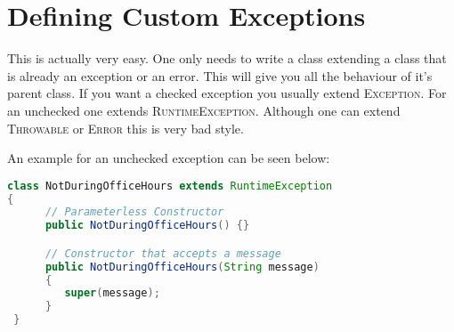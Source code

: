 \documentclass{scrartcl}
\begin{document}
\section{Defining Custom Exceptions}
This is actually very easy. One only needs to write a class extending a class that is already an exception or an error. This will give you all the behaviour of it's parent class. If you want a checked exception you usually extend \textsc{Exception}. For an unchecked one extends \textsc{RuntimeException}. Although one can extend \textsc{Throwable} or \textsc{Error} this is very bad style.

An example for an unchecked exception can be seen below:
\begin{lstlisting}[language=java]
class NotDuringOfficeHours extends RuntimeException
{
      // Parameterless Constructor
      public NotDuringOfficeHours() {}

      // Constructor that accepts a message
      public NotDuringOfficeHours(String message)
      {
         super(message);
      }
 }
\end{lstlisting}
\end{document}
